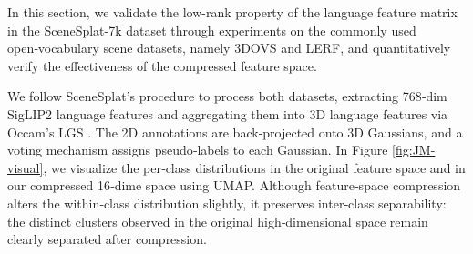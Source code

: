 In this section, we validate the low-rank property of the language feature matrix in the SceneSplat-7k \cite{li2025scenesplat} dataset through experiments on the commonly used open‑vocabulary scene datasets, namely 3DOVS \cite{liu2023weakly} and LERF\cite{lerf2023}, and quantitatively verify the effectiveness of the compressed feature space.

We follow SceneSplat’s procedure to process both datasets, extracting 768‑dim SigLIP2 \cite{tschannen2025siglip} language features and aggregating them into 3D language features via Occam’s LGS \cite{cheng2024occamslgssimpleapproach}. The 2D annotations are back‑projected onto 3D Gaussians, and a voting mechanism assigns pseudo‑labels to each Gaussian. In Figure \ref{fig:JM-visual}, we visualize the per‑class distributions in the original feature space and in our compressed 16‑dime space using UMAP.
Although feature‑space compression alters the within‑class distribution slightly, it preserves inter‑class separability: the distinct clusters observed in the original high‑dimensional space remain clearly separated after compression.

